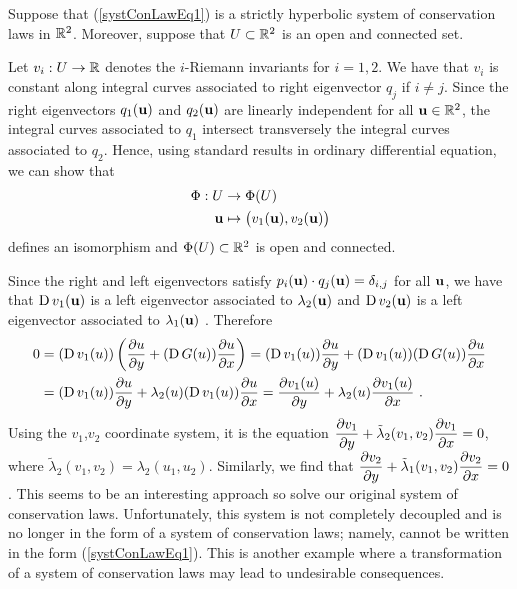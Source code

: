 \begin{rmk}
Suppose that (\ref{systConLawEq1}) is a strictly hyperbolic system of
conservation laws in $\mathbb{R}^2$.  Moreover, suppose that
$U \subset \mathbb{R}^2$ is an open and connected set.

Let $v_i:U \to \mathbb{R}$ denotes the $i$-Riemann invariants for $i=1,2$.
We have that $v_i$ is constant along integral curves associated to
right eigenvector $q_j$ if $i \neq j$.  Since the right eigenvectors
$q_1(\mathbf{u})$ and $q_2(\mathbf{u})$ are linearly independent for all
$\mathbf{u} \in \mathbb{R}^2$, the integral curves associated to $q_1$ intersect
transversely the integral curves associated to $q_2$.  Hence, using
standard results in ordinary differential equation, we can show that
\begin{align*}
\Phi : U & \to \Phi(U) \\
\mathbf{u} &\mapsto \big(v_1(\mathbf{u}), v_2(\mathbf{u})\big)
\end{align*}
defines an isomorphism and $\Phi(U) \subset \mathbb{R}^2$ is open and
connected.

Since the right and left eigenvectors satisfy
$p_i(\mathbf{u})\cdot q_j(\mathbf{u}) = \delta_{i,j}$ for all $\mathbf{u}$,
we have that $\operatorname{D} v_1(\mathbf{u})$ is a left eigenvector associated to
$\lambda_2(\mathbf{u})$ and $\operatorname{D} v_2(\mathbf{u})$ is a left eigenvector
associated to $\lambda_1(\mathbf{u})$ .  Therefore 
\begin{align*}
0 &= (\operatorname{D} v_1(u))  \left( \frac{\partial{u}}{\partial y} + (\operatorname{D} G(u)) \frac{\partial{u}}{\partial x} \right)
= (\operatorname{D} v_1(u)) \frac{\partial{u}}{\partial y} + (\operatorname{D} v_1(u)) (\operatorname{D} G(u)) \frac{\partial{u}}{\partial x} \\
&= (\operatorname{D} v_1(u)) \frac{\partial{u}}{\partial y} + \lambda_2(u) (\operatorname{D} v_1(u)) \frac{\partial{u}}{\partial x}
= \frac{\partial{v_1(u)}}{\partial y} + \lambda_2(u) \frac{\partial{v_1(u)}}{\partial x} \ .
\end{align*}
Using the $v_1$,$v_2$ coordinate system, it is the equation
$\displaystyle \frac{\partial{v_1}}{\partial y} + \tilde{\lambda}_2(v_1,v_2) \frac{\partial{v_1}}{\partial x} =
0$, where $\tilde{\lambda}_2(v_1,v_2) = \lambda_2(u_1,u_2)$.
Similarly, we find that
$\displaystyle \frac{\partial{v_2}}{\partial y} + \tilde{\lambda}_1(v_1,v_2) \frac{\partial{v_2}}{\partial x} = 0$.
This seems to be an interesting approach so solve our original system of
conservation laws.  Unfortunately, this system is not completely
decoupled and is no longer in the form of a system of conservation
laws; namely, cannot be written in the form (\ref{systConLawEq1}).
This is another example where a transformation of a system of
conservation laws may lead to undesirable consequences.
\end{rmk}

